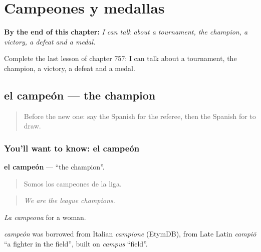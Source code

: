 
\chapter{Campeones y medallas}
\label{ch:es-campeones-y-medallas}

\begin{chapteropening}
\textbf{By the end of this chapter:} \emph{I can talk about a tournament, the champion, a victory, a defeat and a medal.}

Complete the last lesson of chapter 757: I can talk about a tournament, the champion, a victory, a defeat and a medal.
\end{chapteropening}

\section[el campeón]{el campeón — the champion}

\label{lesson:ES-C757-campeon}



\begin{quote}
Before the new one: say the Spanish for the referee, then the Spanish for to draw.
\end{quote}

\subsection*{You'll want to know: el campeón}
\textbf{el campeón} — \textquotedblleft{}the champion\textquotedblright{}.

\begin{quote}
Somos los campeones de la liga.
\end{quote}

\begin{quote}
\emph{We are the league champions.}
\end{quote}

\emph{La campeona} for a woman.

\begin{cousinweb}
\emph{campeón} was borrowed from Italian \emph{campione} (EtymDB), from Late Latin \emph{campiō} \textquotedblleft{}a fighter in the field\textquotedblright{}, built on \emph{campus} \textquotedblleft{}field\textquotedblright{}.
\end{cousinweb}

